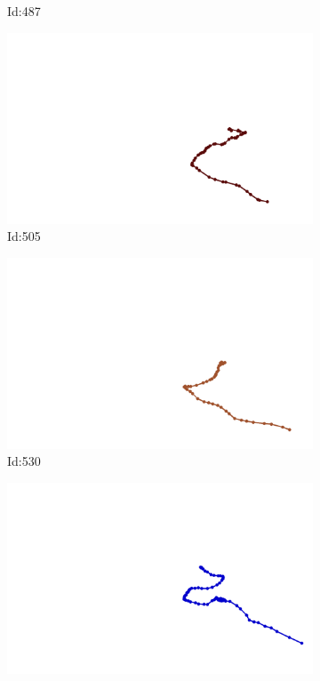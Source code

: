 \documentclass[12pt,twoside]{report}
\begin{document}
\begin{figure}
\begin{subfigure}[b]{0.20\textwidth}
\caption{Id:487}
\end{subfigure}
\begin{subfigure}[b]{0.20\textwidth}
\centering
\includegraphics[width=\textwidth]{../trajectories/505.png}
\caption{Id:505}
\end{subfigure}
\begin{subfigure}[b]{0.20\textwidth}
\centering
\includegraphics[width=\textwidth]{../trajectories/530.png}
\caption{Id:530}
\end{subfigure}
\begin{subfigure}[b]{0.20\textwidth}
\centering
\includegraphics[width=\textwidth]{../trajectories/532.png}

\end{subfigure}
\end{figure}
\end{document}
